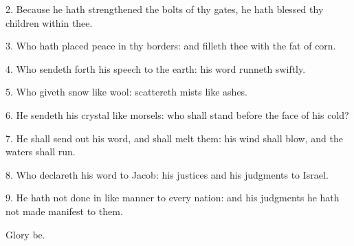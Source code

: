 
2. Because he hath strengthened the bolts of thy gates, he hath blessed thy children within thee.

3. Who hath placed peace in thy borders: and filleth thee with the fat of corn.

4. Who sendeth forth his speech to the earth: his word runneth swiftly.

5. Who giveth snow like wool: scattereth mists like ashes.

6. He sendeth his crystal like morsels: who shall stand before the face of his cold?

7. He shall send out his word, and shall melt them: his wind shall blow, and the waters shall run.

8. Who declareth his word to Jacob: his justices and his judgments to Israel.

9. He hath not done in like manner to every nation: and his judgments he hath not made manifest to them.

Glory be.